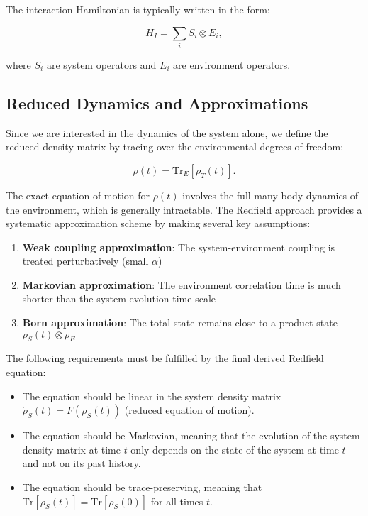 The interaction Hamiltonian is typically written in the form:

\begin{equation}
    H_I = \sum_i S_i \otimes E_i,
    \label{eq:Interaction_Hamiltonian}
\end{equation}

where $S_i$ are system operators and $E_i$ are environment operators.

\subsection{Reduced Dynamics and Approximations}

Since we are interested in the dynamics of the system alone, we define the reduced density matrix by tracing over the environmental degrees of freedom:

\begin{equation}
    \rho(t) = \mathrm{Tr}_E[\rho_T(t)].
    \label{eq:Reduced_Density_Matrix}
\end{equation}

The exact equation of motion for $\rho(t)$ involves the full many-body dynamics of the environment, which is generally intractable. The Redfield approach provides a systematic approximation scheme by making several key assumptions:

\begin{enumerate}
    \item \textbf{Weak coupling approximation}: The system-environment coupling is treated perturbatively (small $\alpha$)
    \item \textbf{Markovian approximation}: The environment correlation time is much shorter than the system evolution time scale
    \item \textbf{Born approximation}: The total state remains close to a product state $\rho_S(t) \otimes \rho_E$
\end{enumerate}

The following requirements must be fulfilled by the final derived Redfield equation:

\begin{itemize}
    \item The equation should be linear in the system density matrix $\dot{\rho}_S(t) = F(\rho_S(t))$ (reduced equation of motion).
    \item The equation should be Markovian, meaning that the evolution of the system density matrix at time $t$ only depends on the state of the system at time $t$ and not on its past history.
    \item The equation should be trace-preserving, meaning that $\mathrm{Tr}[\rho_S(t)] = \mathrm{Tr}[\rho_S(0)]$ for all times $t$.
\end{itemize}

